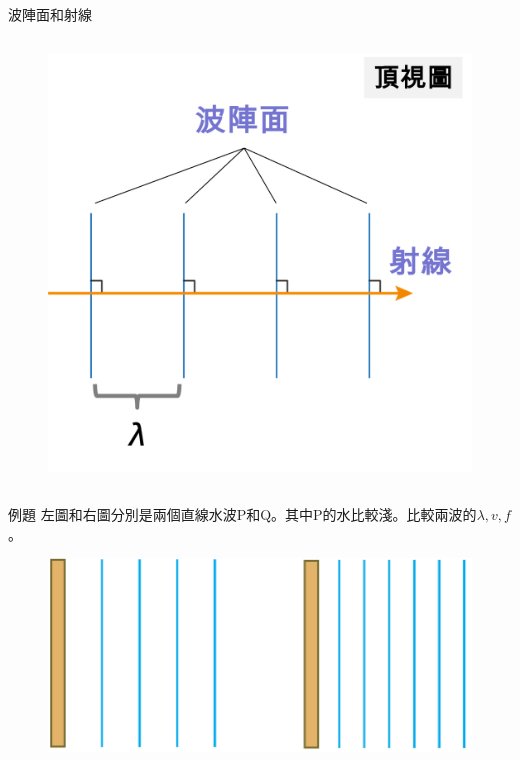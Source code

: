 \documentclass[13pt]{beamer}
\begin{document}
\begin{frame}{波陣面和射線}
\begin{columns}
        \begin{figure}
            \centering
            \includegraphics[width=1\linewidth]{images/4.png}


        \end{figure}


    \end{columns}
\end{frame}

\begin{frame}[t]{例題}
    左圖和右圖分別是兩個直線水波P和Q。其中P的水比較淺。比較兩波的\(\lambda,v,f\)。
    \begin{figure}
        \centering
        \includegraphics[width=0.65\linewidth]{images/Screenshot 2023-09-26 at 11.25.42 PM.png}


    \end{figure}
\end{frame}
\end{document}
